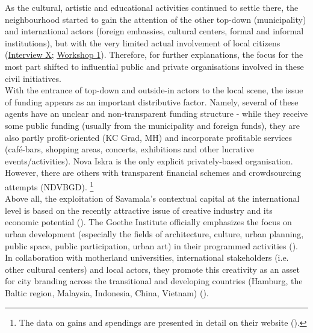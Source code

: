 \documentclass[11pt]{report}
\begin{document}
{{{{As the cultural, artistic and educational activities continued to settle there, the neighbourhood started to gain the attention of the other top-down (municipality) and international actors (foreign embassies, cultural centers, formal and informal institutions), but with the very limited actual involvement of local citizens 
(\href{InterviewX}{Interview X};
\href{Expert Workshop}{Workshop 1}).
Therefore, for further explanations, the focus for the most part shifted to influential public and private organisations involved in these civil initiatives.
\\

With the entrance of top-down and outside-in actors to the local scene, the issue of funding appears as an important distributive factor.
Namely, several of these agents have an unclear and non-transparent funding structure - while they receive some public funding (usually from the municipality and foreign funds), they are also partly profit-oriented (KC Grad, MH) and incorporate profitable services (café-bars, shopping areas, concerts, exhibitions and other lucrative events/activities).
Nova Iskra is the only explicit privately-based organisation.
However, there are others with transparent financial schemes and crowdsourcing attempts (NDVBGD).
\footnote{The data on gains and spendings are presented in detail on their website (\href{NeDavimoBG}{\citealt{ne_davimo_beograd_ne_2015}}).}
\\

Above all, the exploitation of Savamala’s contextual capital at the international level is based on the recently attractive issue of creative industry and its economic potential (\href{ref}{\citealt{landry_creative_2012}}).
The Goethe Institute officially emphasizes the focus on urban development (especially the fields of architecture, culture, urban planning, public space, public participation, urban art) in their programmed activities (\href{Goethe}{\citealt{architecture_-_goethe-institut_architecture_2016}}).
In collaboration with motherland universities, international stakeholders (i.e. other cultural centers) and local actors, they promote this creativity as an asset for city branding across the transitional and developing countries (Hamburg, the Baltic region, Malaysia, Indonesia, China, Vietnam) (\href{ref}{\citealt{waibel_creativity_2014}}).
\\

}}}}
\end{document}
